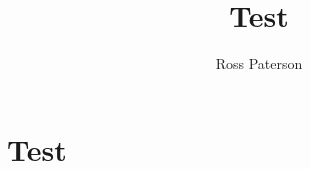 \documentclass{amsart}
\title{Test}
\author{Ross Paterson}
\begin{document}
\maketitle
\section*{Test}
\lipsum[1-7]
\end{document}
